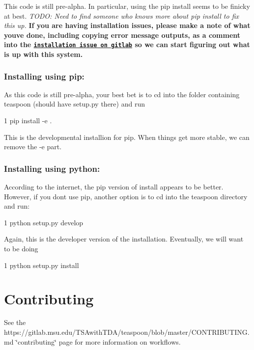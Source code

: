 This code is still pre-\/alpha. In particular, using the pip install seems to be finicky at best. {\itshape T\+O\+DO\+: Need to find someone who knows more about pip install to fix this up.} {\bfseries If you are having installation issues, please make a note of what you\textquotesingle{}ve done, including copying error message outputs, as a comment into the \href{https://gitlab.msu.edu/TSAwithTDA/teaspoon/issues/1}{\tt installation issue on gitlab} so we can start figuring out what is up with this system.}

\subsubsection*{Installing using pip\+:}

As this code is still pre-\/alpha, your best bet is to cd into the folder containing teaspoon (should have setup.\+py there) and run


\begin{DoxyCode}
1 pip install -e .
\end{DoxyCode}


This is the developmental installion for pip. When things get more stable, we can remove the -\/e part.

\subsubsection*{Installing using python\+:}

According to the internet, the pip version of install appears to be better. However, if you don\textquotesingle{}t use pip, another option is to cd into the teaspoon directory and run\+:


\begin{DoxyCode}
1 python setup.py develop
\end{DoxyCode}


Again, this is the developer version of the installation. Eventually, we will want to be doing


\begin{DoxyCode}
1 python setup.py install
\end{DoxyCode}


\section*{Contributing }

See the https\+://gitlab.msu.\+edu/\+T\+S\+Awith\+T\+D\+A/teaspoon/blob/master/\+C\+O\+N\+T\+R\+I\+B\+U\+T\+I\+NG.md \char`\"{}contributing\char`\"{} page for more information on workflows. 